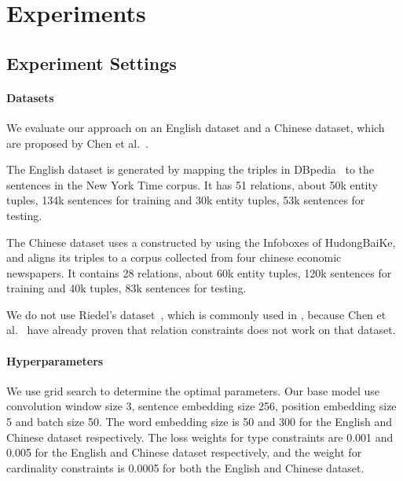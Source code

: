 \section{Experiments}

\subsection{Experiment Settings}
\paragraph{Datasets}
We evaluate our approach on an English dataset and a Chinese dataset, which are proposed by Chen et al.~.


The English dataset is generated by mapping the triples in DBpedia~\cite{bizer2009dbpedia} to the sentences in the New York Time corpus. It has 51 relations, about 50k entity tuples, 134k sentences for training and 30k entity tuples, 53k sentences for testing.

The Chinese dataset uses a \KB constructed by using the Infoboxes of HudongBaiKe,
and aligns its triples to a corpus collected from four chinese economic newspapers.
It contains 28 relations, about 60k entity tuples, 120k sentences for training and 40k tuples, 83k sentences for testing.

We do not use Riedel's dataset~\cite{riedel2010modeling}, which is commonly used in \RE, because  Chen et al.~ have already proven that relation constraints does not work on that dataset.


\paragraph{Hyperparameters}
We use grid search to determine the optimal parameters.
Our base model use convolution window size 3, sentence embedding size 256, position embedding size 5 and batch size 50.
The word embedding size is 50 and 300 for the English and Chinese dataset respectively.
The loss weights for type constraints are 0.001 and 0.005 for the English and Chinese dataset respectively, 
and the weight for cardinality constraints is 0.0005 for both the English and Chinese dataset.

